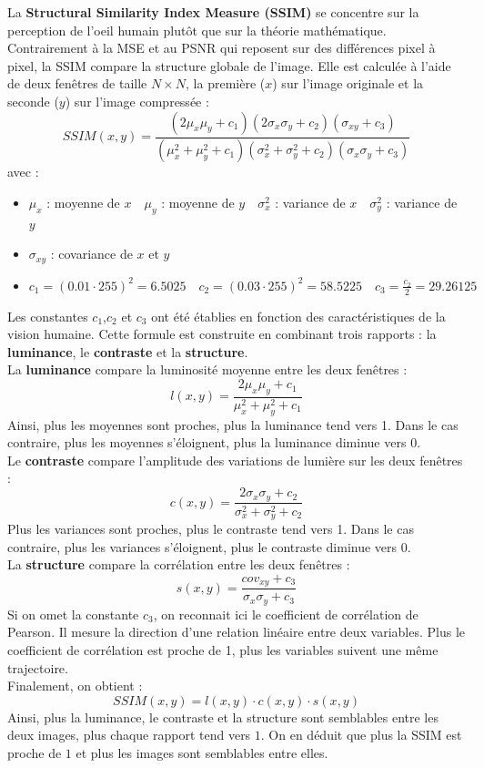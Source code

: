 La \textbf{Structural Similarity Index Measure (SSIM)} se concentre sur la perception de l'oeil humain plutôt que sur la théorie mathématique. 
Contrairement à la MSE et au PSNR qui reposent sur des différences pixel à pixel, la SSIM compare la structure globale de l'image. Elle est calculée à l'aide de 
deux fenêtres de taille $N\times N$, la première ($x$) sur l'image originale et la seconde ($y$) sur l'image compressée : 
$$SSIM(x,y) = \frac{(2\mu_x\mu_y + c_1)(2\sigma_x\sigma_y+c_2)(\sigma_{xy}+c_3)}{(\mu_x^2+\mu_y^2+c_1)(\sigma_x^2+\sigma_y^2+c_2)(\sigma_x\sigma_y+c_3)}$$
avec :
\begin{itemize}
    \item $\mu_x$ : moyenne de $x \quad \mu_y$ : moyenne de $y \quad \sigma_x^2$ : variance de $x \quad \sigma_y^2$ : variance de $y$
    \item $\sigma_{xy}$ : covariance de $x$ et $y$
    \item $c_1 = (0.01\cdot 255)^2 = 6.5025 \quad c_2 = (0.03\cdot 255)^2 = 58.5225 \quad c_3 = \frac{c_2}{2} = 29.26125$
\end{itemize}
Les constantes $c_1$,$c_2$ et $c_3$ ont été établies en fonction des caractéristiques de la vision humaine.
Cette formule est construite en combinant trois rapports : la \textbf{luminance}, le \textbf{contraste} et la \textbf{structure}. \\
La \textbf{luminance} compare la luminosité moyenne entre les deux fenêtres : 
$$ l(x,y) = \frac{2\mu_x \mu_y + c_1}{\mu_x^2 + \mu_y^2 + c_1} $$
Ainsi, plus les moyennes sont proches, plus la luminance tend vers 1. Dans le cas contraire, plus les moyennes s'éloignent, plus la luminance diminue vers $0$. \\
Le \textbf{contraste} compare l'amplitude des variations de lumière sur les deux fenêtres : 
$$ c(x,y) = \frac{2\sigma_x \sigma_y + c_2}{\sigma_x^2 + \sigma_y^2 + c_2} $$
Plus les variances sont proches, plus le contraste tend vers 1. Dans le cas contraire, plus les variances s'éloignent, plus le contraste diminue vers $0$. \\
La \textbf{structure} compare la corrélation entre les deux fenêtres :
$$ s(x,y) = \frac{cov_{xy}+c_3}{\sigma_x\sigma_y+c_3} $$
Si on omet la constante $c_3$, on reconnait ici le coefficient de corrélation de Pearson. Il mesure la direction d'une relation linéaire entre deux variables. 
Plus le coefficient de corrélation est proche de 1, plus les variables suivent une même trajectoire. \\
Finalement, on obtient :
$$ SSIM(x,y) = l(x,y) \cdot c(x,y) \cdot s(x,y) $$
Ainsi, plus la luminance, le contraste et la structure sont semblables entre les deux images, plus chaque rapport tend vers $1$.
On en déduit que plus la SSIM est proche de $1$ et plus les images sont semblables entre elles.

